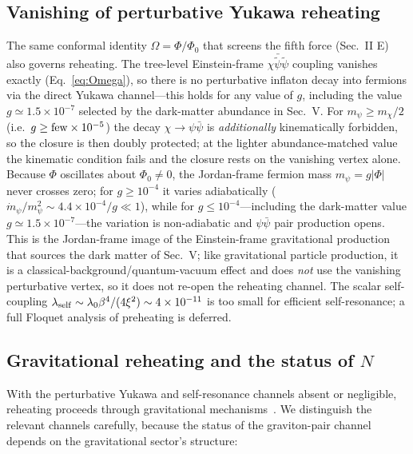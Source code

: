 \documentclass[pdflatex,sn-mathphys-num]{sn-jnl}
\providecommand{\gtrsim}{\geq}
\providecommand{\lesssim}{\leq}
\newcommand{\PhiV}{\Phi_0}
\theoremstyle{thmstyleone}
\begin{document}
\subsection{Vanishing of perturbative Yukawa reheating}

The same conformal identity $\Omega=\Phi/\PhiV$ that screens the fifth force (Sec.~II E) also governs reheating. The tree-level Einstein-frame $\chi\bar{\tilde\psi}\tilde\psi$ coupling vanishes exactly (Eq.~\eqref{eq:Omega}), so there is no perturbative inflaton decay into fermions via the direct Yukawa channel---this holds for any value of $g$, including the value $g\simeq1.5\times10^{-7}$ selected by the dark-matter abundance in Sec.~V. For $m_\psi\gtrsim m_\chi/2$ (i.e.\ $g\gtrsim{\rm few}\times10^{-5}$) the decay $\chi\to\psi\bar\psi$ is \emph{additionally} kinematically forbidden, so the closure is then doubly protected; at the lighter abundance-matched value the kinematic condition fails and the closure rests on the vanishing vertex alone. Because $\Phi$ oscillates about $\PhiV\neq0$, the Jordan-frame fermion mass $m_\psi=g|\Phi|$ never crosses zero; for $g\geq10^{-4}$ it varies adiabatically ($\dot m_\psi/m_\psi^2\sim4.4\times10^{-4}/g\ll1$), while for $g\lesssim10^{-4}$---including the dark-matter value $g\simeq1.5\times10^{-7}$---the variation is non-adiabatic and $\psi\bar\psi$ pair production opens. This is the Jordan-frame image of the Einstein-frame gravitational production that sources the dark matter of Sec.~V; like gravitational particle production, it is a classical-background/quantum-vacuum effect and does \emph{not} use the vanishing perturbative vertex, so it does not re-open the reheating channel. The scalar self-coupling $\lambda_{\rm self}\sim\lambda_0\beta^4/(4\xi^2)\sim4\times10^{-11}$ is too small for efficient self-resonance; a full Floquet analysis of preheating is deferred.

\subsection{Gravitational reheating and the status of $N$}

With the perturbative Yukawa and self-resonance channels absent or negligible, reheating proceeds through gravitational mechanisms~\cite{Kofman1997,BirrellDavies}. We distinguish the relevant channels carefully, because the status of the graviton-pair channel depends on the gravitational sector's structure:
\end{document}
